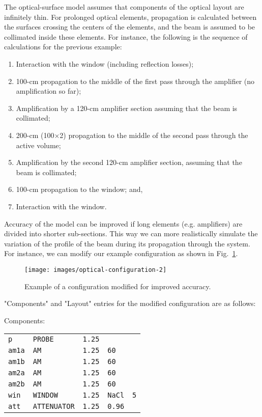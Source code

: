 \documentclass{report}
\begin{document}
The optical-surface model assumes that components of the optical layout are infinitely thin. For prolonged optical elements, propagation is calculated between the surfaces crossing the centers of the elements, and the beam is assumed to be collimated inside these elements. For instance, the following is the sequence of calculations for the previous example:

\begin{enumerate}
\item Interaction with the window (including reflection losses);
\item 100-cm propagation to the middle of the first pass through the amplifier (no amplification so far);
\item Amplification by a 120-cm amplifier section assuming that the beam is collimated;
\item 200-cm (100$\times$2) propagation to the middle of the second pass through the active volume;
\item Amplification by the second 120-cm amplifier section, assuming that the beam is collimated;
\item 100-cm propagation to the window; and,
\item Interaction with the window.
\end{enumerate}

Accuracy of the model can be improved if long elements (e.g. amplifiers) are divided into shorter sub-sections. This way we can more realistically simulate the variation of the profile of the beam during its propagation through the system. For instance, we can modify our example configuration as shown in Fig.~\ref{fig:optical-configuration-2}.

\begin{figure}[ht]
\centering
\texttt{[image: images/optical-configuration-2]}
\caption{Example of a configuration modified for improved accuracy.}\label{fig:optical-configuration-2}
\end{figure}
 
"Components" and "Layout" entries for the modified configuration are as follows:

\bigskip
Components:\nopagebreak

\bigskip
\begin{tabular}{lllll}
\texttt{p}    & \texttt{PROBE}      & \texttt{1.25} &               &           \\
\texttt{am1a} & \texttt{AM}         & \texttt{1.25} & \texttt{60}   &           \\
\texttt{am1b} & \texttt{AM}         & \texttt{1.25} & \texttt{60}   &           \\
\texttt{am2a} & \texttt{AM}         & \texttt{1.25} & \texttt{60}   &           \\
\texttt{am2b} & \texttt{AM}         & \texttt{1.25} & \texttt{60}   &           \\
\texttt{win}  & \texttt{WINDOW}     & \texttt{1.25} & \texttt{NaCl} & \texttt{5}\\
\texttt{att}  & \texttt{ATTENUATOR} & \texttt{1.25} & \texttt{0.96} &
\end{tabular}
\bigskip
\end{document}

